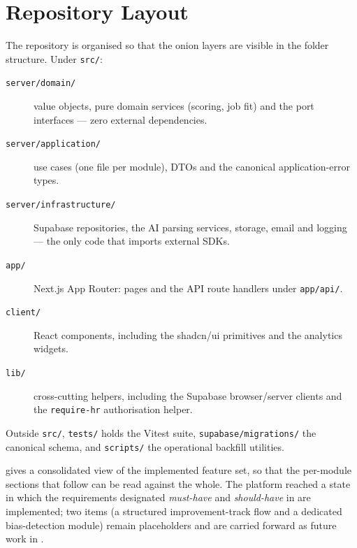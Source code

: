 
\section{Repository Layout}
\label{sec:impl-layout}

The repository is organised so that the onion layers are visible in the
folder structure. Under \texttt{src/}:

\begin{description}
	\item[\texttt{server/domain/}] value objects, pure domain services
	(scoring, job fit) and the port interfaces --- zero external
	dependencies.
	\item[\texttt{server/application/}] use cases (one file per module),
	DTOs and the canonical application-error types.
	\item[\texttt{server/infrastructure/}] Supabase repositories, the AI
	parsing services, storage, email and logging --- the only code that
	imports external SDKs.
	\item[\texttt{app/}] Next.js App Router: pages and the API route
	handlers under \texttt{app/api/}.
	\item[\texttt{client/}] React components, including the shadcn/ui
	primitives and the analytics widgets.
	\item[\texttt{lib/}] cross-cutting helpers, including the Supabase
	browser/server clients and the \texttt{require-hr} authorisation
	helper.
\end{description}

Outside \texttt{src/}, \texttt{tests/} holds the Vitest suite,
\texttt{supabase/migrations/} the canonical schema, and \texttt{scripts/}
the operational backfill utilities.

 gives a consolidated view of the
implemented feature set, so that the per-module sections that follow can be
read against the whole. The platform reached a state in which the
requirements designated \emph{must-have} and \emph{should-have} in
 are implemented; two items (a structured
improvement-track flow and a dedicated bias-detection module) remain
placeholders and are carried forward as future work in
.

